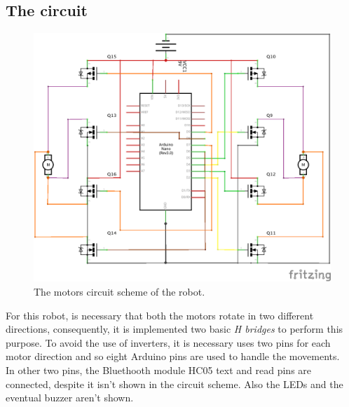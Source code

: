 \subsection{The circuit}
\begin{figure}[h!]
	\centering
	\hspace*{-0.05 \textwidth}\includegraphics[width= 1.1\textwidth]
	{files/images/ReceiverScheme}
	\caption{The motors circuit scheme of the robot.}
\end{figure}
For this robot, is necessary that both the motors rotate in two different directions, consequently, it is implemented two basic \textit{H bridges} to perform this purpose. To avoid the use of inverters, it is necessary uses two pins for each motor direction and so eight Arduino pins are used to handle the movements.\\
In other two pins, the Bluethooth module HC05 text and read pins are connected, despite it isn't shown in the circuit scheme. Also the LEDs and the eventual buzzer aren't shown.